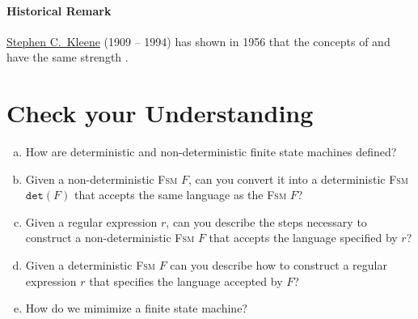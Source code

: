 \paragraph{Historical Remark}
\href{http://en.wikipedia.org/wiki/Stephen_Cole_Kleene}{Stephen C.~Kleene} (1909 -- 1994) has shown in 1956 that the concepts of 
 and  have the same strength
\cite{kleene:1956}.
\pagebreak

\section{Check your Understanding}
\begin{enumerate}[(a)]
\item How are deterministic and non-deterministic finite state machines defined?
\item Given a non-deterministic \textsc{Fsm} $F$, can you convert it into a deterministic \textsc{Fsm}
      $\mathtt{det}(F)$ that accepts the same language as the \textsc{Fsm} $F$?
\item Given a regular expression $r$, can you describe the steps necessary to construct a non-deterministic
      \textsc{Fsm} $F$ that accepts the language specified by $r$?
\item Given a deterministic \textsc{Fsm} $F$ can you describe how to construct a regular expression $r$
      that specifies the language accepted by $F$?
\item How do we mimimize a finite state machine?
\end{enumerate}

